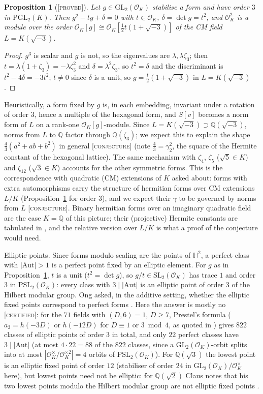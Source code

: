 \documentclass[11pt]{amsart}
\newtheorem{proposition}[theorem]{Proposition}
\theoremstyle{definition}
\theoremstyle{remark}
\newcommand{\Q}{\mathbb{Q}}
\newcommand{\Hb}{\mathbb{H}}
\newcommand{\OK}{\mathcal{O}_K}
\newcommand{\GL}{\mathrm{GL}}
\newcommand{\PGL}{\mathrm{PGL}}
\newcommand{\PSL}{\mathrm{PSL}}
\newcommand{\SL}{\mathrm{SL}}
\newcommand{\Aut}{\mathrm{Aut}}
\newcommand{\PROVED}{\textsc{[proved]}}
\newcommand{\CERT}{\textsc{[certified]}}
\newcommand{\CONJ}{\textsc{[conjecture]}}
\begin{document}
\begin{proposition}[\PROVED]\label{prop:cm}
Let $g\in\GL_2(\OK)$ stabilise a form and have order $3$ in $\PGL_2(K)$.  Then
$g^2-tg+\delta=0$ with $t\in\OK$, $\delta=\det g=t^2$, and $\OK^2$ is a module over the order
$\OK[g]\cong\OK[\tfrac12 t(1+\sqrt{-3})]$ of the CM field $L=K(\sqrt{-3})$.
\end{proposition}
\begin{proof}
$g^3$ is scalar and $g$ is not, so the eigenvalues are $\lambda,\lambda\zeta_3$; then
$t=\lambda(1+\zeta_3)=-\lambda\zeta_3^2$ and $\delta=\lambda^2\zeta_3$, so $t^2=\delta$ and the
discriminant is $t^2-4\delta=-3t^2$; $t\ne0$ since $\delta$ is a unit, so $g=\tfrac t2(1+\sqrt{-3})$ in
$L=K(\sqrt{-3})$.
\end{proof}

Heuristically, a form fixed by $g$ is, in each embedding, invariant under a rotation of order $3$, hence a
multiple of the hexagonal form, and $S[v]$ becomes a norm form of $L$ on a rank-one $\OK[g]$-module.
Since $L=K(\sqrt{-3})\supset\Q(\sqrt{-3})$, norms from $L$ to $\Q$ factor through
$\Q(\zeta_3)$; we expect this to explain the shape $\frac43(a^2+ab+b^2)$ in general \CONJ{}
(note $\frac43=\gamma_2^2$, the square of the Hermite constant of the hexagonal lattice).  The same mechanism with $\zeta_4$, $\zeta_5$
($\sqrt5\in K$) and $\zeta_{12}$ ($\sqrt3\in K$) accounts for the other symmetric forms.  This is
the correspondence with quadratic (CM) extensions of $K$ asked about: forms with extra
automorphisms carry the structure of hermitian forms over CM extensions $L/K$
(Proposition~\ref{prop:cm} for order $3$), and we expect their $\gamma$ to be governed by norms
from $L$ \CONJ.  Binary hermitian forms over an imaginary quadratic field are the case $K=\Q$
of this picture; their (projective) Hermite constants are tabulated in \cite[Table~1]{CIL}, and
the relative version over $L/K$ is what a proof of the conjecture would need.

Elliptic points.  Since forms modulo scaling are the points of $\Hb^2$, a perfect class with
$|\Aut|>1$ is a perfect point fixed by an elliptic element.  For $g$ as in
Proposition~\ref{prop:cm}, $t$ is a unit ($t^2=\det g$), so $g/t\in\SL_2(\OK)$ has trace $1$ and
order $3$ in $\PSL_2(\OK)$: every class with $3\mid|\Aut|$ is an elliptic point of order $3$ of
the Hilbert modular group.  Ong asked, in the additive setting, whether the elliptic fixed points
correspond to perfect forms \cite{Ong}.  Here the answer is mostly no \CERT: for the $71$ fields
with $(D,6)=1$, $D\ge7$, Prestel's formula ($a_3=h(-3D)$ or $h(-12D)$ for $D\equiv1$ or $3\bmod4$,
as quoted in \cite[p.~198]{Hirzebruch}) gives $822$ classes of elliptic points of order $3$ in total,
and only $22$ perfect classes have $3\mid|\Aut|$ (at most $4\cdot22=88$ of the $822$ classes, since a
$\GL_2(\OK)$-orbit splits into at most $|\OK^\times/\OK^{\times2}|=4$ orbits of $\PSL_2(\OK)$).
For $\Q(\sqrt3)$ the lowest point is an elliptic fixed point of order $12$ \cite[Satz~3]{Claus}
(stabiliser of order $24$ in $\GL_2(\OK)/\OK^\times$ here), but lowest points need not be elliptic:
for $\Q(\sqrt2)$ Claus notes that his two lowest points modulo the Hilbert modular group are not
elliptic fixed points \cite[\S4]{Claus}.
\end{document}
